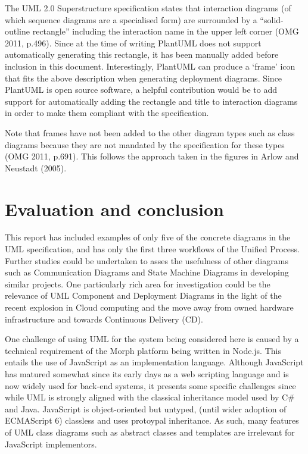 \documentclass[a4paper]{article}
\begin{document}
The UML 2.0 Superstructure specification states that interaction diagrams (of which sequence diagrams are a specialised form) are surrounded by a ``solid-outline rectangle'' including the interaction name in the upper left corner (OMG 2011, p.496). Since at the time of writing PlantUML does not support automatically generating this rectangle, it has been manually added before inclusion in this document. Interestingly, PlantUML can produce a `frame' icon that fits the above description when generating deployment diagrams. Since PlantUML is open source software, a helpful contribution would be to add support for automatically adding the rectangle and title to interaction diagrams in order to make them compliant with the specification. 

Note that frames have not been added to the other diagram types such as class diagrams because they are not mandated by the specification for these types (OMG 2011, p.691). This follows the approach taken in the figures in Arlow and Neustadt (2005).

\section{Evaluation and conclusion}

This report has included examples of only five of the concrete diagrams in the UML specification, and has only the first three workflows of the Unified Process. Further studies could be undertaken to asses the usefulness of other diagrams such as Communication Diagrams and State Machine Diagrams in developing similar projects. One particularly rich area for investigation could be the relevance of UML Component and Deployment Diagrams in the light of the recent explosion in Cloud computing and the move away from owned hardware infrastructure and towards Continuous Delivery (CD).

One challenge of using UML for the system being considered here is caused by a technical requirement of the Morph platform being written in Node.js. This entails the use of JavaScript as an implementation language. Although JavaScript has matured somewhat since its early days as a web scripting language and is now widely used for back-end systems, it presents some specific challenges since while UML is strongly aligned with the classical inheritance model used by C\# and Java. JavaScript is object-oriented but untyped, (until wider adoption of ECMAScript 6) classless and uses protoypal inheritance. As such, many features of UML class diagrams such as abstract classes and templates are irrelevant for JavaScript implementors.
\end{document}
